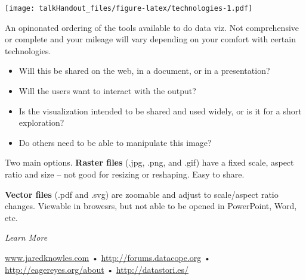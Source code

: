 \documentclass{tufte-handout}
\begin{document}
\begin{marginfigure}
 \texttt{[image: talkHandout\_files/figure-latex/technologies-1.pdf]}
\caption{An opinonated ordering of the tools available to do data viz. Not comprehensive or complete and your mileage will vary depending on your comfort with certain technologies.}
\end{marginfigure}

\begin{itemize}
\itemsep1pt\parskip0pt
\item
  Will this be shared on the web, in a document, or in a presentation?
\item
  Will the users want to interact with the output?
\item
  Is the visualization intended to be shared and used widely, or is it
  for a short exploration?
\item
  Do others need to be able to manipulate this image?
\end{itemize}

\noindent Two main options. \textbf{Raster files} (.jpg, .png, and .gif)
have a fixed scale, aspect ratio and size -- not good for resizing or
reshaping. Easy to share.

\textbf{Vector files} (.pdf and .svg) are zoomable and adjust to
scale/aspect ratio changes. Viewable in browesrs, but not able to be
opened in PowerPoint, Word, etc.

\noindent \emph{Learn More}

\href{http://www.jaredknowles.com/presentations}{www.jaredknowles.com} •
\href{http://forums.datacope.org}{\url{http://forums.datacope.org}} •
\href{http://eagereyes.org/about}{\url{http://eagereyes.org/about}} •
\href{http://datastori.es/}{\url{http://datastori.es/}}
\end{document}
